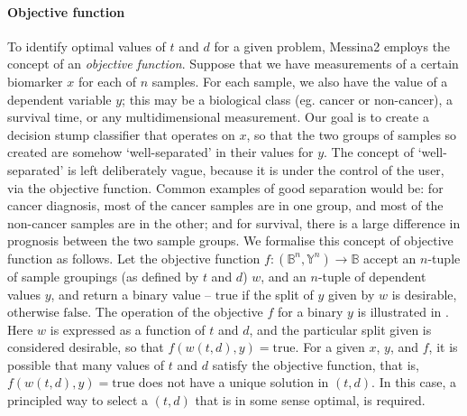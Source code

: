 \documentclass[dissertation.tex]{subfiles}
\begin{document}
\paragraph{Objective function}
To identify optimal values of $t$ and $d$ for a given problem, Messina2 employs the concept of an \emph{objective function}.  Suppose that we have measurements of a certain biomarker $x$ for each of $n$ samples.  For each sample, we also have the value of a dependent variable $y$; this may be a biological class (eg. cancer or non-cancer), a survival time, or any multidimensional measurement.  Our goal is to create a decision stump classifier that operates on $x$, so that the two groups of samples so created are somehow `well-separated' in their values for $y$.  The concept of `well-separated' is left deliberately vague, because it is under the control of the user, via the objective function.  Common examples of good separation would be: for cancer diagnosis, most of the cancer samples are in one group, and most of the non-cancer samples are in the other; and for survival, there is a large difference in prognosis between the two sample groups.  We formalise this concept of objective function as follows.  Let the objective function $f: (\mathbb{B}^n, \mathbb{Y}^n) \rightarrow \mathbb{B}$ accept an $n$-tuple of sample groupings (as defined by $t$ and $d$) $w$, and an $n$-tuple of dependent values $y$, and return a binary value -- $\mathrm{true}$ if the split of $y$ given by $w$ is desirable, otherwise $\mathrm{false}$.  The operation of the objective $f$ for a binary $y$ is illustrated in .  Here $w$ is expressed as a function of $t$ and $d$, and the particular split given is considered desirable, so that $f(w(t, d), y) = \mathrm{true}$.  For a given $x$, $y$, and $f$, it is possible that many values of $t$ and $d$ satisfy the objective function, that is, $f(w(t, d), y) = \mathrm{true}$ does not have a unique solution in $(t, d)$.  In this case, a principled way to select a $(t, d)$ that is in some sense optimal, is required.
\end{document}
